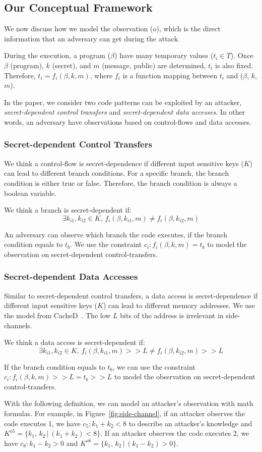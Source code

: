 \subsection{Our Conceptual Framework}
\label{side-channel:condition}
We now discuss how we model the observation (o), which is the direct information
that an adversary can get during the attack.

During the execution, a program ($\beta$) have many temporary values ($t_i \in
T$). Once $\beta$ (program), $k$ (secret), and $m$ (message, public) are
determined, $t_i$ is also fixed. Therefore, $ t_i = f_i(\beta, k, m)$, where $f_
i$ is a function mapping between $t_i$ and ($\beta$, $k$, $m$).

In the paper, we consider two code patterns can be exploited by an attacker,
\emph{secret-dependent control transfers} and \emph{secret-dependent data
accesses}. In other words, an adversary have observations based on control-flows
and data accesses.

\subsubsection{Secret-dependent Control Transfers}
We think a control-flow is secret-dependence if different input sensitive keys
($K$) can lead to different branch conditions. For a specific branch, the branch
condition is either true or false. Therefore, the branch condition is always a
boolean variable.

We think a branch is secret-dependent if:
$$\exists k_{i1}, k_{i2} \in K, \,f_i(\beta, k_{i1}, m) \neq f_i(\beta, k_{i2}, m)$$

An adversary can observe which branch the code executes, if the branch condition
equals to $t_b$. We use the constraint $c_i : f_i(\beta, k, m) = t_b$ to model
the observation on secret-dependent control-transfers.

\subsubsection{Secret-dependent Data Accesses}
Similar to secret-dependent control transfers, a data access is
secret-dependence if different input sensitive keys ($K$) can lead to different
memory addresses. We use the model from CacheD~\cite{203878}. The low $L$ bits
of the address is irrelevant in side-channels.

We think a data access is secret-dependent if:
$$\exists k_{i1}, k_{i2} \in K, \,f_i(\beta, k_{i1}, m) >> L \neq f_i(\beta, k_{i2}, m) >> L$$

If the branch condition equals to $t_b$, we can use the constraint $c_i :
f_i(\beta, k, m) >> L = t_b >> L$ to model the observation on secret-dependent
control-transfers.

With the following definition, we can model an attacker's observation with math
formulas. For example, in Figure~\ref{fig:side-channel}, if an attacker
observes the code executes 1, we have $c_5: k_1 + k_2 < 8$ to describe an
attacker's knowledge and $K^{o5} = \{k_1,\, k_2\,|\, (k_1 + k_2) < 8\}$. If an
attacker observes the code executes 2, we have $c_8: k_1 - k_2 > 0$ and $K^{o8}
= \{k_1,\, k_2\,|\, (k_1 - k_2) > 0\}$.

